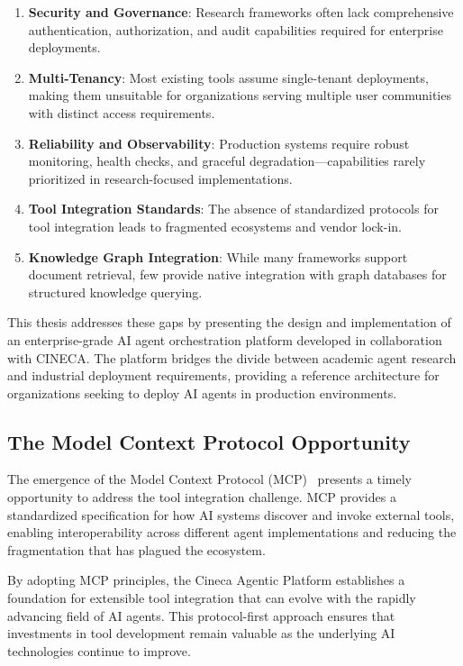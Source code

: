 \documentclass[a4paper,twoside]{sapthesis}
\begin{document}
\begin{enumerate}
    \item \textbf{Security and Governance}: Research frameworks often lack comprehensive authentication, authorization, and audit capabilities required for enterprise deployments.
    
    \item \textbf{Multi-Tenancy}: Most existing tools assume single-tenant deployments, making them unsuitable for organizations serving multiple user communities with distinct access requirements.
    
    \item \textbf{Reliability and Observability}: Production systems require robust monitoring, health checks, and graceful degradation---capabilities rarely prioritized in research-focused implementations.
    
    \item \textbf{Tool Integration Standards}: The absence of standardized protocols for tool integration leads to fragmented ecosystems and vendor lock-in.
    
    \item \textbf{Knowledge Graph Integration}: While many frameworks support document retrieval, few provide native integration with graph databases for structured knowledge querying.
\end{enumerate}

This thesis addresses these gaps by presenting the design and implementation of an enterprise-grade AI agent orchestration platform developed in collaboration with CINECA. The platform bridges the divide between academic agent research and industrial deployment requirements, providing a reference architecture for organizations seeking to deploy AI agents in production environments.

\subsection{The Model Context Protocol Opportunity}

The emergence of the Model Context Protocol (MCP)~\cite{anthropic2024mcp} presents a timely opportunity to address the tool integration challenge. MCP provides a standardized specification for how AI systems discover and invoke external tools, enabling interoperability across different agent implementations and reducing the fragmentation that has plagued the ecosystem.

By adopting MCP principles, the Cineca Agentic Platform establishes a foundation for extensible tool integration that can evolve with the rapidly advancing field of AI agents. This protocol-first approach ensures that investments in tool development remain valuable as the underlying AI technologies continue to improve.
\end{document}
